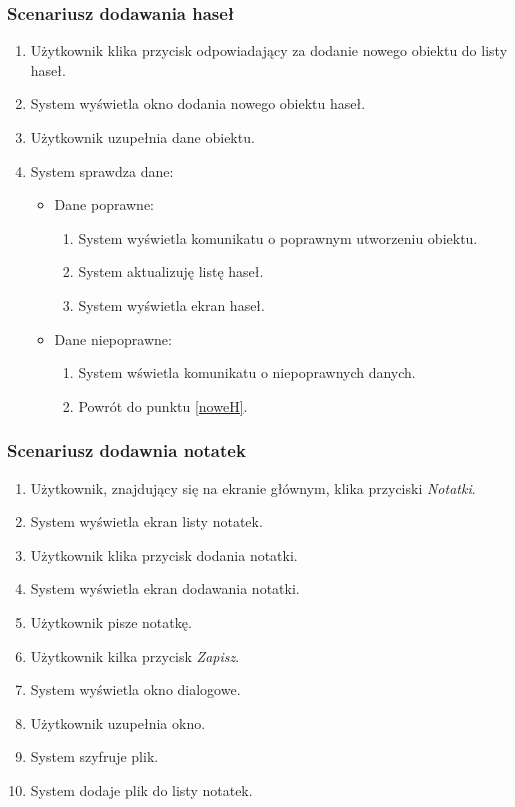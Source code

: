 \documentclass[a4paper]{article}
\begin{document}
\subsubsection{Scenariusz dodawania haseł}
\begin{enumerate}
    \item Użytkownik klika przycisk odpowiadający za dodanie nowego obiektu do listy haseł.
    \item System wyświetla okno dodania nowego obiektu haseł.\label{noweH}
    \item Użytkownik uzupełnia dane obiektu.
    \item System sprawdza dane:
    \begin{itemize}
        \item Dane poprawne:
        \begin{enumerate}
            \item System wyświetla  komunikatu o poprawnym utworzeniu obiektu.
            \item System aktualizuję listę haseł.
            \item System wyświetla ekran haseł.
        \end{enumerate}
        \item Dane niepoprawne:
        \begin{enumerate}
            \item System wświetla komunikatu o niepoprawnych danych.
            \item Powrót do punktu \ref{noweH}.
        \end{enumerate}
    \end{itemize}
\end{enumerate}

\subsubsection{Scenariusz dodawnia notatek} \label{sdn}
\begin{enumerate}
    \item Użytkownik, znajdujący się na ekranie głównym, klika przyciski \textit{Notatki}.
    \item System wyświetla ekran listy notatek.
    \item Użytkownik klika przycisk dodania notatki.
    \item System wyświetla ekran dodawania notatki.
    \item Użytkownik pisze notatkę.
    \item Użytkownik kilka przycisk \textit{Zapisz}.
    \item System wyświetla okno dialogowe. \label{zapiszN}
    \item Użytkownik uzupełnia okno.
    \item System szyfruje plik.
    \item System dodaje plik do listy notatek.
\end{enumerate}
\end{document}
